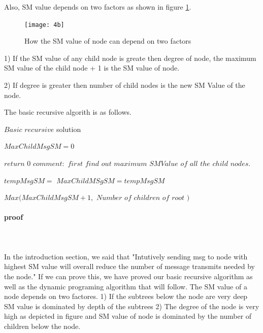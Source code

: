 Also, SM value depends on two factors as shown in figure \ref{fig:4b}. 

\begin{figure}[4b]
    \centering
    \texttt{[image: 4b]}
    \caption{How the SM value of node can depend on two factors}
    \label{fig:4b}
\end{figure}




1) If the SM value of any child node is greate then degree of node, the maximum SM value of the child node  + 1 is the SM value of node.

2) If degree is greater then number of child nodes is the new SM Value of the node. 

The basic recursive algorith is as follows. 


\begin{algorithm}
	\caption{$Basic $ $recursive $ solution}
	\begin{algorithmic}
		\State $ MaxChildMsgSM = 0 $
		
			\State $ return$ $ 0$ 	
		\EndIf
	  	\State 		
		\State $ comment: $ $ first $ $ find $ $ out $ $ maximum $ $ SMValue $  $ of $ $ all $ $ the $ $ child $ $ nodes.$		
		
		\State $tempMsgSM =$  
			\State $MaxChildMSgSM = tempMsgSM$
		\EndIf
		\State	
		
		\EndFor
		
		\Return $ Max(MaxChildMsgSM + 1, $ $ Number$ $ of $ $ children $ $ of $ $ root $ $ ) $
			 
	  \EndFunction
	
	  
	\end{algorithmic}
\end{algorithm}


\paragraph{proof} \\
\\
In the introduction section, we said that "Intutively sending msg to node with highest SM value will overall reduce the number of message transmits needed by the node." If we can prove this, we have proved our basic recursive algorithm as well as the dynamic programing algorithm that will follow. The SM value of a node depends on two factores. 1) If the subtrees below the node are very deep SM value is dominated by depth of the subtrees 2) The degree of the node is very high as depicted in figure and SM value of node is dominated by the number of children below the node. 


